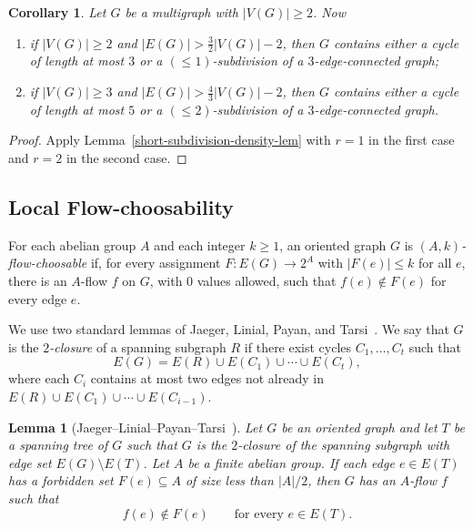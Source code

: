 \documentclass[a4paper,12pt]{article}
\theoremstyle{plain}
\newtheorem{lemA}[thmA]{Lemma}
\newtheorem{cor}[theorem]{Corollary}
\theoremstyle{definition}
\renewcommand\le\leqslant
\renewcommand\ge\geqslant
\begin{document}
\begin{cor}
    \label{sparse-good-subgraph-unified}
    Let $G$ be a multigraph with $|V(G)|\ge 2$. Now
    \begin{enumerate}[label=(\arabic*)]
        \item if $|V(G)|\ge 2$ and $|E(G)|>\frac{3}{2}|V(G)|-2$, then $G$ contains either a cycle of length at most $3$ or a $(\le 1)$-subdivision of a $3$-edge-connected graph;
        \item if $|V(G)|\ge 3$ and $|E(G)|>\frac{4}{3}|V(G)|-2$, then $G$ contains either a cycle of length at most $5$ or a $(\le 2)$-subdivision of a $3$-edge-connected graph.
    \end{enumerate}
\end{cor}

\begin{proof}
Apply Lemma~\ref{short-subdivision-density-lem} with $r=1$ in the first case and $r=2$ in the second case.
\end{proof}

\subsection{Local Flow-choosability}

For each abelian group $A$ and each integer $k\ge 1$, an oriented graph $G$ is \emph{$(A,k)$-flow-choosable} if, for every assignment $F:E(G)\to 2^A$ with $|F(e)|\le k$ for all $e$, there is an $A$-flow $f$ on $G$, with 0 values allowed, such that $f(e)\notin F(e)$ for every edge $e$.

We use two standard lemmas of Jaeger, Linial, Payan, and Tarsi~\cite{jaeger-et-al}.  We say that $G$ is the \emph{$2$-closure} of a spanning subgraph $R$ if there exist cycles $C_1,\ldots,C_t$ such that
\[
    E(G)=E(R)\cup E(C_1)\cup\cdots\cup E(C_t),
\]
where each $C_i$ contains at most two edges not already in $E(R)\cup E(C_1)\cup\cdots\cup E(C_{i-1})$.

\begin{lemA}[Jaeger--Linial--Payan--Tarsi~{\cite[Lemma~2.1]{jaeger-et-al}}]
    \label{two-closure-lem}
    Let $G$ be an oriented graph and let $T$ be a spanning tree of $G$ such that $G$ is the $2$-closure of the spanning subgraph with edge set $E(G)\setminus E(T)$.  Let $A$ be a finite abelian group.  If each edge $e\in E(T)$ has a forbidden set $F(e)\subseteq A$ of size less than $|A|/2$, then $G$ has an $A$-flow $f$ such that
    \[
        f(e)\notin F(e)\qquad\text{for every }e\in E(T).
    \]
\end{lemA}
\end{document}
